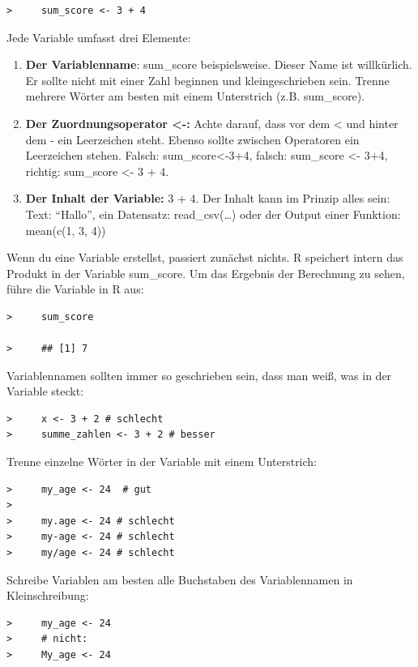\documentclass[
]{book}
\begin{document}
\begin{verbatim}
>     sum_score <- 3 + 4
\end{verbatim}

Jede Variable umfasst drei Elemente:

\begin{enumerate}
\def\labelenumi{\arabic{enumi}.}
\item
  \textbf{Der Variablenname}: sum\_score beispielsweise. Dieser Name ist willkürlich. Er sollte nicht mit einer Zahl beginnen und kleingeschrieben sein. Trenne mehrere Wörter am besten mit einem Unterstrich (z.B. sum\_score).
\item
  \textbf{Der Zuordnungsoperator \textless-:} Achte darauf, dass vor dem \textless{} und hinter dem - ein Leerzeichen steht. Ebenso sollte zwischen Operatoren ein Leerzeichen stehen. Falsch: sum\_score\textless-3+4, falsch: sum\_score \textless- 3+4, richtig: sum\_score \textless- 3 + 4.
\item
  \textbf{Der Inhalt der Variable:} 3 + 4. Der Inhalt kann im Prinzip alles sein: Text: ``Hallo'', ein Datensatz: read\_csv(\ldots) oder der Output einer Funktion: mean(c(1, 3, 4))
\end{enumerate}

Wenn du eine Variable erstellst, passiert zunächst nichts. R speichert intern das Produkt in der Variable sum\_score. Um das Ergebnis der Berechnung zu sehen, führe die Variable in R aus:

\begin{verbatim}
>     sum_score

>     ## [1] 7
\end{verbatim}

Variablennamen sollten immer so geschrieben sein, dass man weiß, was in der Variable steckt:

\begin{verbatim}
>     x <- 3 + 2 # schlecht
>     summe_zahlen <- 3 + 2 # besser
\end{verbatim}

Trenne einzelne Wörter in der Variable mit einem Unterstrich:

\begin{verbatim}
>     my_age <- 24  # gut
>
>     my.age <- 24 # schlecht
>     my-age <- 24 # schlecht
>     my/age <- 24 # schlecht
\end{verbatim}

Schreibe Variablen am besten alle Buchstaben des Variablennamen in Kleinschreibung:

\begin{verbatim}
>     my_age <- 24
>     # nicht:
>     My_age <- 24
\end{verbatim}
\end{document}
